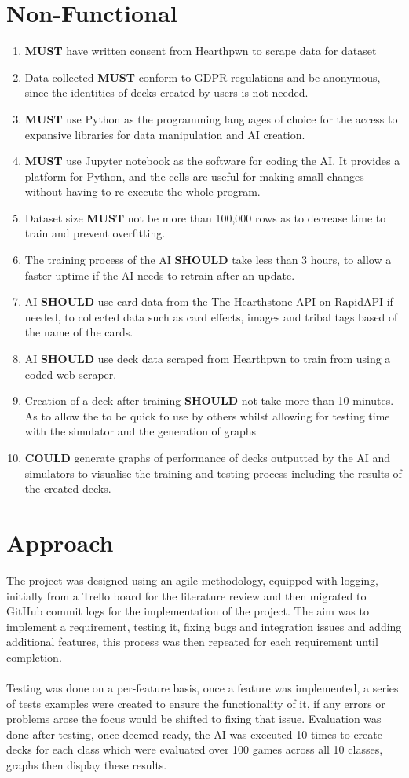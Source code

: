 \documentclass{report} %
\begin{document}
\section{Non-Functional}
\begin{enumerate}
\item \textbf{MUST} have written consent from Hearthpwn to scrape data for dataset
\item Data collected \textbf{MUST} conform to GDPR regulations and be anonymous, since the identities of decks created by users is not needed.
\item \textbf{MUST} use Python as the programming languages of choice for the access to expansive libraries for data manipulation and AI creation.
\item \textbf{MUST} use Jupyter notebook as the software for coding the AI. It provides a platform for Python, and the cells are useful for making small changes without having to re-execute the whole program.
\item Dataset size \textbf{MUST} not be more than 100,000 rows as to decrease time to train and prevent overfitting.
\item The training process of the AI \textbf{SHOULD} take less than 3 hours, to allow a faster uptime if the AI needs to retrain after an update.
\item AI \textbf{SHOULD} use card data from the The Hearthstone API on RapidAPI if needed, to collected data such as card effects, images and tribal tags based of the name of the cards.
\item AI \textbf{SHOULD} use deck data scraped from Hearthpwn to train from using a coded web scraper.
\item Creation of a deck after training \textbf{SHOULD} not take more than 10 minutes. As to allow the to be quick to use by others whilst allowing for testing time with the simulator and the generation of graphs
\item \textbf{COULD} generate graphs of performance of decks outputted by the AI and simulators to visualise the training and testing process including the results of the created decks. 
\end{enumerate}
\section{Approach}
The project was designed using an agile methodology, equipped with logging, initially from a Trello board for the literature review and then migrated to GitHub commit logs for the implementation of the project. The aim was to implement a requirement, testing it, fixing bugs and integration issues and adding additional features, this process was then repeated for each requirement until completion. \\ \\
Testing was done on a per-feature basis, once a feature was implemented, a series of tests examples were created to ensure the functionality of it, if any errors or problems arose the focus would be shifted to fixing that issue. Evaluation was done after testing, once deemed ready, the AI was executed 10 times to create decks for each class which were evaluated over 100 games across all 10 classes, graphs then display these results.
\end{document}
